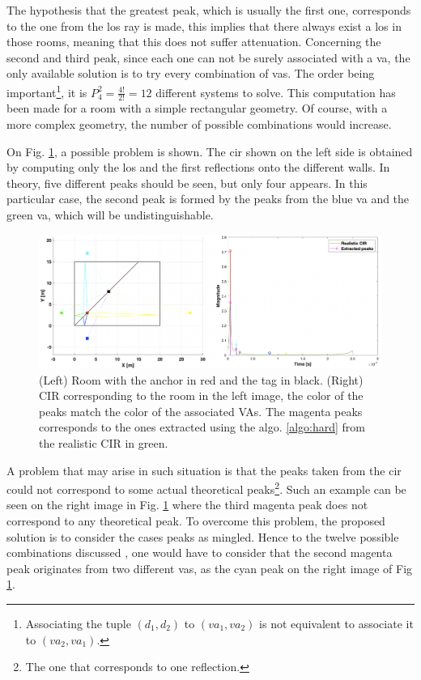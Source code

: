 The hypothesis that the greatest peak, which is usually the first one, corresponds to the one from the \gls{los} ray is made, this implies that there always exist a \gls{los} in those rooms, meaning that this does not suffer attenuation. Concerning the second and third peak, since each one can not be surely associated with a \gls{va}, the only available solution is to try every combination of \glspl{va}. The order being important\footnote{Associating the tuple $(d_1, d_2)$ to $(va_1, va_2)$ is not equivalent to associate it to $(va_2, va_1)$.}, it is $P^2_4 = \frac{4!}{2!} = 12$ different systems to solve. This computation has been made for a room with a simple rectangular geometry. Of course, with a more complex geometry, the number of possible combinations would increase.
\vspace{2mm}

On Fig. \ref{fig:va_sym}, a possible problem is shown. The \gls{cir} shown on the left side is obtained by computing only the \gls{los} and the first reflections onto the different walls. In theory, five different peaks should be seen, but only four appears. In this particular case, the second peak is formed by the peaks from the blue \gls{va} and the green \gls{va}, which will be undistinguishable.

\begin{figure}[H]
\centering
\includegraphics[width=\linewidth]{Images/antenna_combined.png}
\caption{(Left) Room with the anchor in red and the tag in black. (Right) CIR corresponding to the room in the left image, the color of the peaks match the color of the associated VAs. The magenta peaks corresponds to the ones extracted using the algo. \ref{algo:hard} from the realistic CIR in green. \label{fig:va_sym}}
\end{figure}

A problem that may arise in such situation is that the peaks taken from the \gls{cir} could not correspond to some actual theoretical peaks\footnote{The one that corresponds to one reflection. }. Such an example can be seen on the right image in  Fig. \ref{fig:va_sym} where the third magenta peak does not correspond to any theoretical peak. To overcome this problem, the proposed solution is to consider the cases peaks as mingled. Hence to the twelve possible combinations discussed , one would have to consider that the second magenta peak originates from two different \glspl{va}, as the cyan peak on the right image of Fig \ref{fig:va_sym}.
\vspace{2mm}

